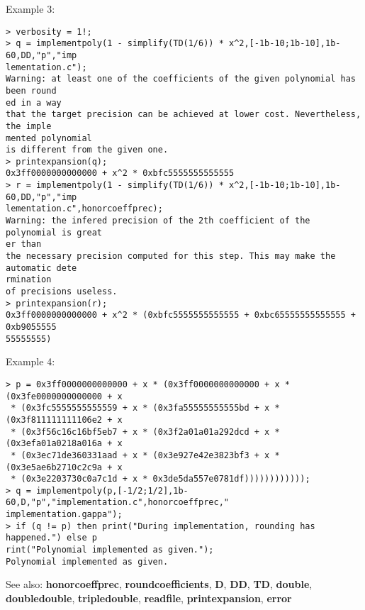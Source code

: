 \noindent Example 3: 
\begin{center}\begin{minipage}{15cm}\begin{Verbatim}[frame=single]
> verbosity = 1!;
> q = implementpoly(1 - simplify(TD(1/6)) * x^2,[-1b-10;1b-10],1b-60,DD,"p","imp
lementation.c");
Warning: at least one of the coefficients of the given polynomial has been round
ed in a way
that the target precision can be achieved at lower cost. Nevertheless, the imple
mented polynomial
is different from the given one.
> printexpansion(q);
0x3ff0000000000000 + x^2 * 0xbfc5555555555555
> r = implementpoly(1 - simplify(TD(1/6)) * x^2,[-1b-10;1b-10],1b-60,DD,"p","imp
lementation.c",honorcoeffprec);
Warning: the infered precision of the 2th coefficient of the polynomial is great
er than
the necessary precision computed for this step. This may make the automatic dete
rmination
of precisions useless.
> printexpansion(r);
0x3ff0000000000000 + x^2 * (0xbfc5555555555555 + 0xbc65555555555555 + 0xb9055555
55555555)
\end{Verbatim}
\end{minipage}\end{center}
\noindent Example 4: 
\begin{center}\begin{minipage}{15cm}\begin{Verbatim}[frame=single]
> p = 0x3ff0000000000000 + x * (0x3ff0000000000000 + x * (0x3fe0000000000000 + x
 * (0x3fc5555555555559 + x * (0x3fa55555555555bd + x * (0x3f811111111106e2 + x
 * (0x3f56c16c16bf5eb7 + x * (0x3f2a01a01a292dcd + x * (0x3efa01a0218a016a + x
 * (0x3ec71de360331aad + x * (0x3e927e42e3823bf3 + x * (0x3e5ae6b2710c2c9a + x
 * (0x3e2203730c0a7c1d + x * 0x3de5da557e0781df))))))))))));
> q = implementpoly(p,[-1/2;1/2],1b-60,D,"p","implementation.c",honorcoeffprec,"
implementation.gappa");
> if (q != p) then print("During implementation, rounding has happened.") else p
rint("Polynomial implemented as given.");	
Polynomial implemented as given.
\end{Verbatim}
\end{minipage}\end{center}
See also: \textbf{honorcoeffprec}, \textbf{roundcoefficients}, \textbf{D}, \textbf{DD}, \textbf{TD}, \textbf{double}, \textbf{doubledouble}, \textbf{tripledouble}, \textbf{readfile}, \textbf{printexpansion}, \textbf{error}

